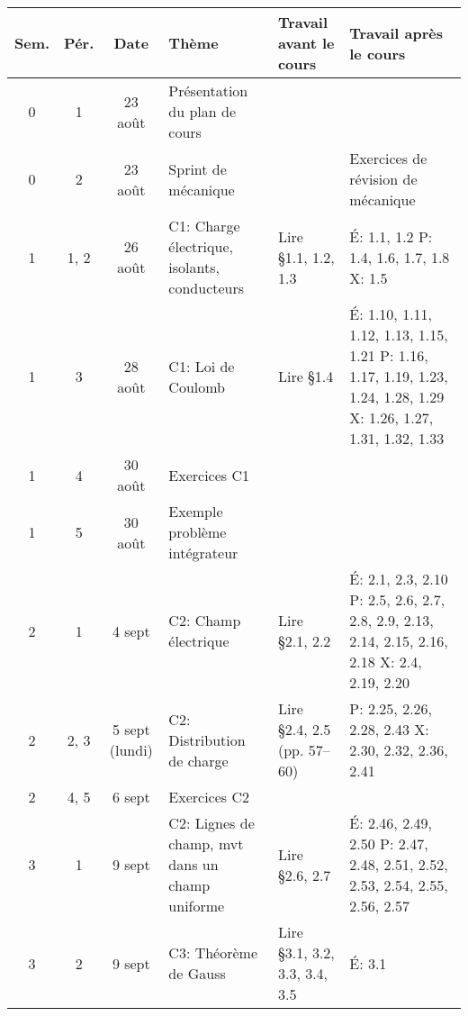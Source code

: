 \documentclass[10pt]{article}
\begin{document}
\sffamily
\renewcommand{\arraystretch}{1.2}
\begin{longtable}{cccp{6cm}lp{9cm}}
  \toprule
  \textbf{Sem.}  &  \textbf{Pér.}  &  \textbf{Date}  &  \textbf{Thème}
    &  \textbf{Travail avant le cours}
    &  \textbf{Travail après le cours}  \\
  \midrule
  \endhead
  0     &  1     &  23 août  &  Présentation du plan de cours
    &  &  \\
  0     &  2     &  23 août  &  Sprint de mécanique
    &  &  Exercices de révision de mécanique  \\
  \midrule
  1     &  1, 2  &  26 août     &  C1: Charge électrique, isolants, conducteurs
    & Lire \S 1.1, 1.2, 1.3
    & É: 1.1, 1.2 \newline 
      P: 1.4, 1.6, 1.7, 1.8 \newline 
      X: 1.5  \\
  1     &  3     &  28 août     &  C1: Loi de Coulomb
    & Lire \S 1.4
    & É: 1.10, 1.11, 1.12, 1.13, 1.15, 1.21 \newline
      P: 1.16, 1.17, 1.19, 1.23, 1.24, 1.28, 1.29 \newline 
      X: 1.26, 1.27, 1.31, 1.32, 1.33 \\
  1     &  4     &  30 août  &  Exercices C1
    &   &    \\
  1     &  5     &  30 août   &  Exemple problème intégrateur
    &   &    \\
  \midrule
  2     &  1     &  4 sept          &  C2: Champ électrique
    &  Lire \S 2.1, 2.2
    &  É: 2.1, 2.3, 2.10 \newline 
       P: 2.5, 2.6, 2.7, 2.8, 2.9, 2.13, 2.14, 2.15, 2.16, 2.18  \newline
       X: 2.4, 2.19, 2.20 \\
  2     &  2, 3     &  5 sept (lundi)  &  C2: Distribution de charge
    &  Lire \S 2.4, 2.5 (pp. 57--60)
    &  P: 2.25, 2.26, 2.28, 2.43 \newline
       X: 2.30, 2.32, 2.36, 2.41 \\
  2     &  4, 5  &  6 sept          &  Exercices C2  \\
  \midrule
  3     &  1  &  9 sept    &  C2: Lignes de champ, mvt dans un champ uniforme
    & Lire \S 2.6, 2.7
    &  É: 2.46, 2.49, 2.50 \newline 
       P: 2.47, 2.48, 2.51, 2.52, 2.53, 2.54, 2.55, 2.56, 2.57 \\
  3     &  2  &  9 sept    &  C3: Théorème de Gauss
    & Lire \S 3.1, 3.2, 3.3, 3.4, 3.5 
    &  É: 3.1 \newline 

\end{longtable}
\end{document}
